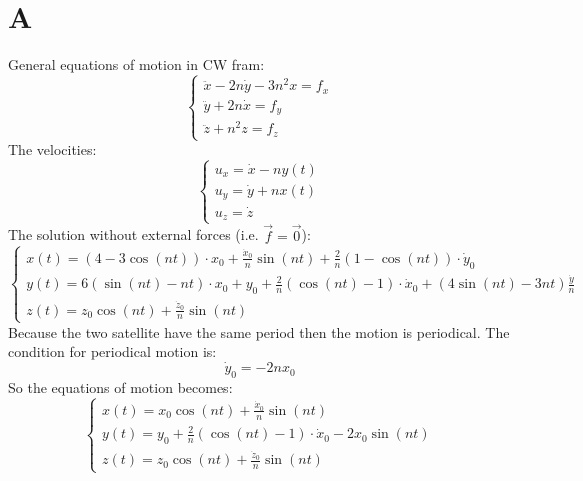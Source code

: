 \documentclass[11pt, a4paper]{article}
\begin{document}
\section{A}
General equations of motion in CW fram:
\begin{equation}
    \left\{\begin{array}{l}
        \ddot{x}-2n\dot{y}-3n^2x=f_x\\
        \ddot{y}+2n\dot{x}=f_y\\
        \ddot{z}+n^2z=f_z
    \end{array}\right.
\end{equation}
The velocities:
\begin{equation}
    \left\{\begin{array}{l}
        u_x = \dot{x}-ny(t)\\
        u_y = \dot{y}+nx(t)\\
        u_z = \dot{z}
    \end{array}\right.
\end{equation}
The solution without external forces (i.e. $\vec{f}=\vec{0}$):
\begin{equation}
    \left\{\begin{array}{l}
        \displaystyle x(t) = \left(4-3\cos(nt)\right)\cdot x_0 + \frac{\dot{x}_0}{n}\sin(nt)+\frac{2}{n}\left(1-\cos(nt)\right)\cdot\dot{y}_0 \\
        \displaystyle y(t) = 6\left(\sin(nt)-nt\right)\cdot x_0 + y_0 + \frac{2}{n}\left(\cos(nt)-1\right)\cdot\dot{x}_0 + \left(4\sin(nt)-3nt\right)\frac{\dot{y}}{n} \\
        \displaystyle z(t)=z_0\cos(nt)+\frac{\dot{z}_0}{n}\sin(nt)
    \end{array}\right.
\end{equation}
Because the two satellite have the same period then the motion is periodical. The condition for periodical motion is:
\begin{equation}
    \dot{y}_0=-2nx_0
\end{equation}
So the equations of motion becomes:
\begin{equation}
    \left\{\begin{array}{l}
        \displaystyle x(t) = x_0\cos(nt) + \frac{\dot{x}_0}{n}\sin(nt) \\
        \displaystyle y(t) = y_0 + \frac{2}{n}\left(\cos(nt)-1\right)\cdot\dot{x}_0 -2x_0\sin(nt) \\
        \displaystyle z(t)=z_0\cos(nt)+\frac{\dot{z}_0}{n}\sin(nt)
    \end{array}\right.
\end{equation}
\end{document}
